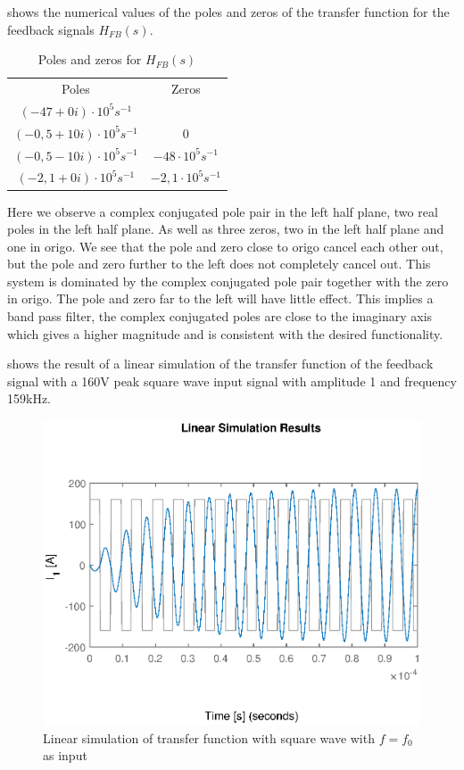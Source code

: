  shows the numerical values of the poles and zeros of the transfer function for the feedback signals $H_{FB}(s)$.

\begin{table}[H]
    \centering
    \begin{tabular}{c|c}
        Poles & Zeros \\
        $(-47 + 0i)\cdot 10^{5} s^{-1}$ & \\
        $(-0,5 + 10i)\cdot 10^{5} s^{-1}$ & $0$ \\
        $(-0,5 - 10i)\cdot 10^{5} s^{-1}$ & $-48\cdot 10^{5} s^{-1}$ \\
        $(-2,1 + 0i)\cdot 10^{5} s^{-1}$ & $-2,1\cdot 10^{5} s^{-1}$ \\
    \end{tabular}
    \caption{Poles and zeros for $H_{FB}(s)$}
    \label{tab:fbcoilrigpoles}
\end{table}

Here we observe a complex conjugated pole pair in the left half plane, two real poles in the left half plane. As well as three zeros, two in the left half plane and one in origo. We see that the pole and zero close to origo cancel each other out, but the pole and zero further to the left does not completely cancel out. This system is dominated by the complex conjugated pole pair together with the zero in origo. The pole and zero far to the left will have little effect. This implies a band pass filter, the complex conjugated poles are close to the imaginary axis which gives a higher magnitude and is consistent with the desired functionality.

 shows the result of a linear simulation of the transfer function of the feedback signal with a 160V peak square wave input signal with amplitude 1 and frequency 159kHz.

\begin{figure}[H]
    \centering
    \includegraphics[width=\textwidth]{img/FeedBackSimulation.eps}
    \caption{Linear simulation of transfer function with square wave with $f=f_0$ as input}
    \label{fig:fblinsim}
\end{figure}

